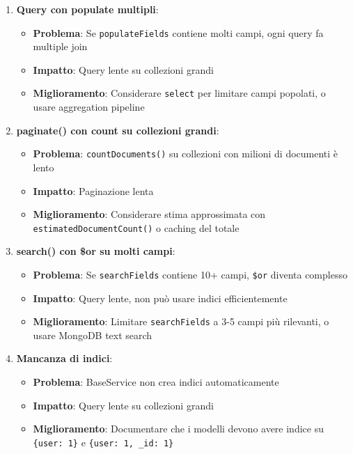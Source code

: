 \documentclass[11pt,a4paper]{article}
\begin{document}
\begin{enumerate}
    \item \textbf{Query con populate multipli}:
    \begin{itemize}
        \item \textbf{Problema}: Se \texttt{populateFields} contiene molti campi, ogni query fa multiple join
        \item \textbf{Impatto}: Query lente su collezioni grandi
        \item \textbf{Miglioramento}: Considerare \texttt{select} per limitare campi popolati, o usare aggregation pipeline
    \end{itemize}
    
    \item \textbf{paginate() con count su collezioni grandi}:
    \begin{itemize}
        \item \textbf{Problema}: \texttt{countDocuments()} su collezioni con milioni di documenti è lento
        \item \textbf{Impatto}: Paginazione lenta
        \item \textbf{Miglioramento}: Considerare stima approssimata con \texttt{estimatedDocumentCount()} o caching del totale
    \end{itemize}
    
    \item \textbf{search() con \$or su molti campi}:
    \begin{itemize}
        \item \textbf{Problema}: Se \texttt{searchFields} contiene 10+ campi, \texttt{\$or} diventa complesso
        \item \textbf{Impatto}: Query lente, non può usare indici efficientemente
        \item \textbf{Miglioramento}: Limitare \texttt{searchFields} a 3-5 campi più rilevanti, o usare MongoDB text search
    \end{itemize}
    
    \item \textbf{Mancanza di indici}:
    \begin{itemize}
        \item \textbf{Problema}: BaseService non crea indici automaticamente
        \item \textbf{Impatto}: Query lente su collezioni grandi
        \item \textbf{Miglioramento}: Documentare che i modelli devono avere indice su \texttt{\{user: 1\}} e \texttt{\{user: 1, \_id: 1\}}
    \end{itemize}
\end{enumerate}
\end{document}
